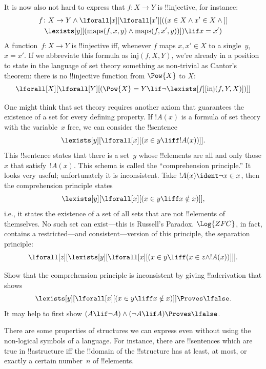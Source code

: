 It is now also not hard to express that $f\colon X \to Y$ is
!!{injective}, for instance:
\begin{multline*}
 f \colon X \to Y \land \lforall[x][\lforall[x'][((x \in X \land x' \in
     X \land {}]] \\
 \lexists[y][(\mathrm{maps}(f, x, y) \land \mathrm{maps}(f,
        x', y))]) \lif x = x')
\end{multline*}
A function~$f\colon X \to Y$ is !!{injective} iff, whenever $f$ maps $x, x'
\in X$ to a single~$y$, $x = x'$.  If we abbreviate this formula as
$\mathrm{inj}(f, X, Y)$, we're already in a position to state in the
language of set theory something as non-trivial as Cantor's theorem:
there is no !!{injective} function from $\Pow{X}$ to $X$:
\[
\lforall[X][\lforall[Y][(\Pow{X} = Y \lif
    \lnot\lexists[f][\mathrm{inj}(f, Y, X)])]]
\]

One might think that set theory requires another axiom that guarantees
the existence of a set for every defining property. If $!A(x)$ is a
formula of set theory with the variable~$x$ free, we can consider the
!!{sentence}
\[
\lexists[y][\lforall[x][(x \in y \liff !A(x))]].
\]
This !!{sentence} states that there is a set~$y$ whose !!{element}s
are all and only those $x$ that satisfy~$!A(x)$. This schema is called
the ``comprehension principle.''  It looks very useful; unfortunately
it is inconsistent.  Take $!A(x) \ident \lnot x \in x$, then the
comprehension principle states
\[
\lexists[y][\lforall[x][(x \in y \liff x \notin x)]],
\]
i.e., it states the existence of a set of all sets that are not
!!{element}s of themselves. No such set can exist---this is Russell's
Paradox.  $\Log{ZFC}$, in fact, contains a restricted---and
consistent---version of this principle, the separation principle:
\[
\lforall[z][\lexists[y][\lforall[x][(x \in y \liff (x \in z \land
      !A(x))]]].
\]

\begin{prob}
Show that the comprehension principle is inconsistent by giving
!!a{derivation} that shows
\[
\lexists[y][\lforall[x][(x \in y \liff x \notin x)]] \Proves \lfalse.
\]
It may help to first show $(A \lif \lnot A) \land (\lnot A \lif A)
\Proves \lfalse$.
\end{prob}






\begin{explain}
There are some properties of structures we can express even without
using the non-logical symbols of a language.  For instance, there are
!!{sentence}s which are true in !!a{structure} iff the !!{domain} of
the !!{structure} has at least, at most, or exactly a certain
number~$n$ of !!{element}s.
\end{explain}

